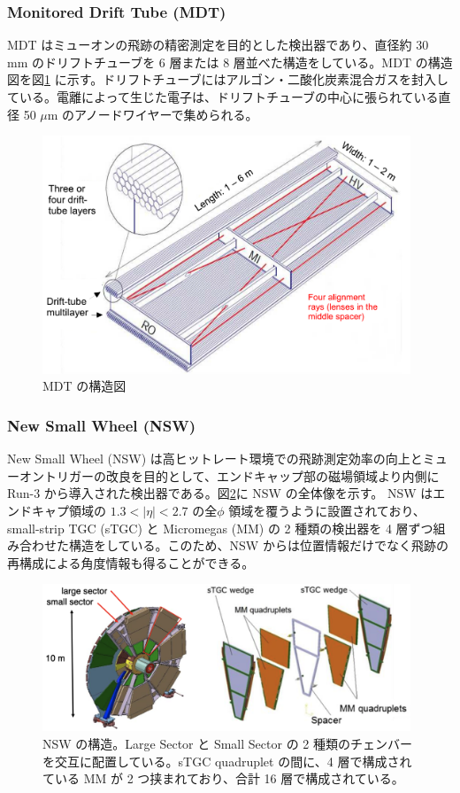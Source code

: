 \subsubsection{Monitored Drift Tube (MDT)}
MDT はミューオンの飛跡の精密測定を目的とした検出器であり、直径約 30 mm のドリフトチューブを 6 層または 8 層並べた構造をしている。MDT の構造図を図\ref{fig:MDT} に示す。ドリフトチューブにはアルゴン・二酸化炭素混合ガスを封入している。電離によって生じた電子は、ドリフトチューブの中心に張られている直径 50 $\mu$m のアノードワイヤーで集められる。


\begin{figure}[tb]
  \centering
  \includegraphics[clip, width=11cm]{fig/2/MDT_chamber_schematics_2.pdf}
  \caption{MDT の構造図}
  \label{fig:MDT}
\end{figure}


\subsubsection{New Small Wheel (NSW)}
New Small Wheel (NSW) は高ヒットレート環境での飛跡測定効率の向上とミューオントリガーの改良を目的として、エンドキャップ部の磁場領域より内側に Run-3 から導入された検出器である。図\ref{fig:NSW}に NSW の全体像を示す。
NSW はエンドキャプ領域の $1.3 < |\eta| < 2.7$ の全$\phi$ 領域を覆うように設置されており、small-strip TGC (sTGC) と Micromegas (MM) の 2 種類の検出器を 4 層ずつ組み合わせた構造をしている。このため、NSW からは位置情報だけでなく飛跡の再構成による角度情報も得ることができる。

\begin{figure}[tb]
  \centering
  \includegraphics[clip, width=11cm]{fig/2/nsw-structure.png}
  \caption{NSW の構造。Large Sector と Small Sector の 2 種類のチェンバーを交互に配置している。sTGC quadruplet の間に、4 層で構成されている MM が 2 つ挟まれており、合計 16 層で構成されている。}
  \label{fig:NSW}
\end{figure}

